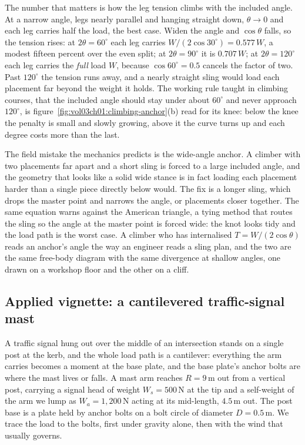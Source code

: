 The number that matters is how the leg tension climbs with the included angle.
At a narrow angle, legs nearly parallel and hanging straight down, $\theta \to
0$ and each leg carries half the load, the best case. Widen the angle and
$\cos\theta$ falls, so the tension rises: at $2\theta = 60^{\circ}$ each leg
carries $W/(2\cos 30^{\circ}) = 0.577\,W$, a modest fifteen percent over the
even split; at $2\theta = 90^{\circ}$ it is $0.707\,W$; at $2\theta =
120^{\circ}$ each leg carries the \emph{full} load $W$, because $\cos
60^{\circ} = 0.5$ cancels the factor of two. Past $120^{\circ}$ the tension
runs away, and a nearly straight sling would load each placement far beyond the
weight it holds. The working rule taught in climbing courses, that the included
angle should stay under about $60^{\circ}$ and never approach $120^{\circ}$, is
figure~\ref{fig:vol03ch01:climbing-anchor}(b) read for its knee: below the knee
the penalty is small and slowly growing, above it the curve turns up and each
degree costs more than the last.

The field mistake the mechanics predicts is the wide-angle anchor. A climber
with two placements far apart and a short sling is forced to a large included
angle, and the geometry that looks like a solid wide stance is in fact loading
each placement harder than a single piece directly below would. The fix is a
longer sling, which drops the master point and narrows the angle, or placements
closer together. The same equation warns against the American triangle, a
tying method that routes the sling so the angle at the master point is forced
wide: the knot looks tidy and the load path is the worst case. A climber who
has internalised $T = W/(2\cos\theta)$ reads an anchor's angle the way an
engineer reads a sling plan, and the two are the same free-body diagram with
the same divergence at shallow angles, one drawn on a workshop floor and the
other on a cliff.

\subsection{Applied vignette: a cantilevered traffic-signal mast}

A traffic signal hung out over the middle of an intersection stands on a single
post at the kerb, and the whole load path is a cantilever: everything the arm
carries becomes a moment at the base plate, and the base plate's anchor bolts
are where the mast lives or falls. A mast arm reaches $R = 9\,\si{\meter}$ out
from a vertical post, carrying a signal head of weight $W_s = 500\,\text{N}$ at
the tip and a self-weight of the arm we lump as $W_a = 1{,}200\,\text{N}$
acting at its mid-length, $4.5\,\si{\meter}$ out. The post base is a plate held
by anchor bolts on a bolt circle of diameter $D = 0.5\,\si{\meter}$. We trace
the load to the bolts, first under gravity alone, then with the wind that
usually governs.

